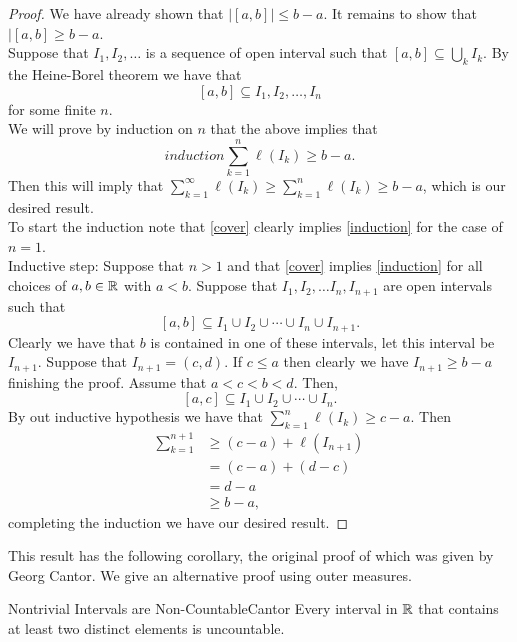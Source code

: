 \documentclass[twoside, openright, fontsize=10pt, headings=big]{scrbook}
\begin{document}
\begin{proof}
    We have already shown that $|[a,b]|\leq b-a$. It remains to show that $|[a,b]\geq b-a$.\\
    Suppose that $I_1,I_2,\dots$ is a sequence of open interval such that $[a,b]\subseteq\bigcup_k I_k$. By the Heine-Borel theorem we have that 
    \begin{equation}\label{cover}
        [a,b]\subseteq I_1,I_2,\dots,I_n
    \end{equation}
    for some finite $n$.\\
    We will prove by induction on $n$ that the above implies that 
    \begin{equation}{induction}
        \sum_{k=1}^{n}\ell(I_k)\geq b-a.
    \end{equation}
    Then this will imply that $ \sum_{k=1}^{\infty}\ell(I_k)\geq\sum_{k=1}^{n}\ell(I_k)\geq b-a$, which is our desired result.\\
    To start the induction note that \ref{cover} clearly implies \ref{induction} for the case of $n=1$.\\
    Inductive step: Suppose that $n>1$ and that \ref{cover} implies \ref{induction} for all choices of $a,b\in\mathbb{R}$ with $a<b$. Suppose that $I_1,I_2,\dots I_n,I_{n+1}$ are open intervals such that 
    \[
        [a,b]\subseteq I_1\cup I_2\cup\cdots\cup I_n\cup I_{n+1}.
    \]
    Clearly we have that $b$ is contained in one of these intervals, let this interval be $I_{n+1}$. Suppose that $I_{n+1}=(c,d)$. If $c\leq a$ then clearly we have $I_{n+1}\geq b-a$ finishing the proof. Assume that $a<c<b<d$. Then,
    \[
        [a,c]\subseteq I_1\cup I_2\cup\cdots\cup I_n.
    \]
    By out inductive hypothesis we have that $\sum_{k=1}^{n}\ell(I_k)\geq c-a$. Then
    \begin{align*}
        \sum_{k=1}^{n+1}&\geq(c-a)+\ell(I_{n+1})\\
        &=(c-a)+(d-c)\\
        &=d-a\\
        &\geq b-a,
    \end{align*}
    completing the induction we have our desired result. 
\end{proof}
This result has the following corollary, the original proof of which was given by Georg Cantor. We give an alternative proof using outer measures.
\begin{corollary}{Nontrivial Intervals are Non-Countable}{Cantor}
    Every interval in $\mathbb{R}$ that contains at least two distinct elements is uncountable.
\end{corollary}
\end{document}
